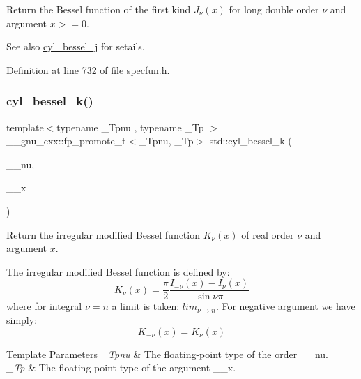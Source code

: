 Return the Bessel function of the first kind $ J_{\nu}(x) $ for {\ttfamily long double} order $ \nu $ and argument $ x >= 0 $.

\begin{DoxySeeAlso}{See also}
\hyperlink{group__tr29124__math__spec__func_ga644f7eb975809674db88768f2f115744}{cyl\+\_\+bessel\+\_\+j} for setails. 
\end{DoxySeeAlso}


Definition at line 732 of file specfun.\+h.

\mbox{\label{group__tr29124__math__spec__func_gac73d664b8e7ceba7f8e786c93e97a084}} 
\subsubsection{\texorpdfstring{cyl\+\_\+bessel\+\_\+k()}{cyl\_bessel\_k()}}
{\footnotesize\ttfamily template$<$typename \+\_\+\+Tpnu , typename \+\_\+\+Tp $>$ \\
\+\_\+\+\_\+gnu\+\_\+cxx\+::fp\+\_\+promote\+\_\+t$<$\+\_\+\+Tpnu, \+\_\+\+Tp$>$ std\+::cyl\+\_\+bessel\+\_\+k (\begin{DoxyParamCaption}\item[{\+\_\+\+Tpnu}]{\+\_\+\+\_\+nu,  }\item[{\+\_\+\+Tp}]{\+\_\+\+\_\+x }\end{DoxyParamCaption})\hspace{0.3cm}{\ttfamily [inline]}}

Return the irregular modified Bessel function $ K_{\nu}(x) $ of real order $ \nu $ and argument $ x $.

The irregular modified Bessel function is defined by\+: \[ K_{\nu}(x) = \frac{\pi}{2} \frac{I_{-\nu}(x) - I_{\nu}(x)}{\sin \nu\pi} \] where for integral $ \nu = n $ a limit is taken\+: $ lim_{\nu \to n} $. For negative argument we have simply\+: \[ K_{-\nu}(x) = K_{\nu}(x) \]


\begin{DoxyTemplParams}{Template Parameters}
{\em \+\_\+\+Tpnu} & The floating-\/point type of the order {\ttfamily \+\_\+\+\_\+nu}. \\
\hline
{\em \+\_\+\+Tp} & The floating-\/point type of the argument {\ttfamily \+\_\+\+\_\+x}. \\
\hline
\end{DoxyTemplParams}

